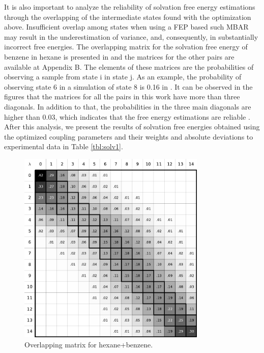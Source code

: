 It is also important to analyze the reliability of solvation free energy estimations  through the overlapping of the intermediate states found with the optimization above. Insufficient overlap among states when using a FEP based such MBAR may result in the underestimation of variance, and, consequently, in substantially incorrect free energies. The overlapping matrix for the solvation free energy of benzene in hexane is presented in  and the matrices for the other pairs are available at Appendix B. The elements of these matrices are the probabilities of observing a sample from state  i in state j. As an example, the probability of observing state 6 in a simulation of state 8 is 0.16 in . It can be observed in the figures that  the matrices for all the pairs in this work have more than  three diagonals. In addition to that,  the probabilities in the three main diagonals are higher than 0.03, which indicates that the free energy estimations are reliable \cite{klimovich}. After this analysis, we present the results of solvation free energies obtained using the optimized coupling parameters and their weights and absolute deviations to experimental data  in Table \ref{tbl:solv1}.   

\begin{figure}[H]
	\centering
	\includegraphics[width=0.8\textwidth]{Figures/ohex_benz}
	\caption{Overlapping matrix for hexane+benzene.}
    \label{fig:hexove}
\end{figure}

